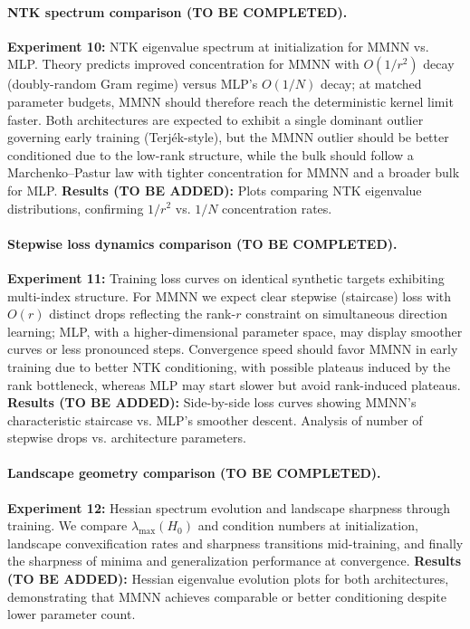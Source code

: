 \documentclass{article}
\begin{document}
\paragraph{NTK spectrum comparison (TO BE COMPLETED).}
\textbf{Experiment 10:} NTK eigenvalue spectrum at initialization for MMNN vs. MLP.
Theory predicts improved concentration for MMNN with \( O(1/r^2) \) decay (doubly-random Gram regime) versus MLP's \( O(1/N) \) decay; at matched parameter budgets, MMNN should therefore reach the deterministic kernel limit faster. Both architectures are expected to exhibit a single dominant outlier governing early training (Terjék-style), but the MMNN outlier should be better conditioned due to the low-rank structure, while the bulk should follow a Marchenko–Pastur law with tighter concentration for MMNN and a broader bulk for MLP.
\textbf{Results (TO BE ADDED):} Plots comparing NTK eigenvalue distributions, confirming \( 1/r^2 \) vs. \( 1/N \) concentration rates.

\paragraph{Stepwise loss dynamics comparison (TO BE COMPLETED).}
\textbf{Experiment 11:} Training loss curves on identical synthetic targets exhibiting multi-index structure.
For MMNN we expect clear stepwise (staircase) loss with \( O(r) \) distinct drops reflecting the rank-\( r \) constraint on simultaneous direction learning; MLP, with a higher-dimensional parameter space, may display smoother curves or less pronounced steps. Convergence speed should favor MMNN in early training due to better NTK conditioning, with possible plateaus induced by the rank bottleneck, whereas MLP may start slower but avoid rank-induced plateaus.
\textbf{Results (TO BE ADDED):} Side-by-side loss curves showing MMNN's characteristic staircase vs. MLP's smoother descent. Analysis of number of stepwise drops vs. architecture parameters.

\paragraph{Landscape geometry comparison (TO BE COMPLETED).}
\textbf{Experiment 12:} Hessian spectrum evolution and landscape sharpness through training.
We compare \( \lambda_{\max}(H_0) \) and condition numbers at initialization, landscape convexification rates and sharpness transitions mid-training, and finally the sharpness of minima and generalization performance at convergence.
\textbf{Results (TO BE ADDED):} Hessian eigenvalue evolution plots for both architectures, demonstrating that MMNN achieves comparable or better conditioning despite lower parameter count.
\end{document}
